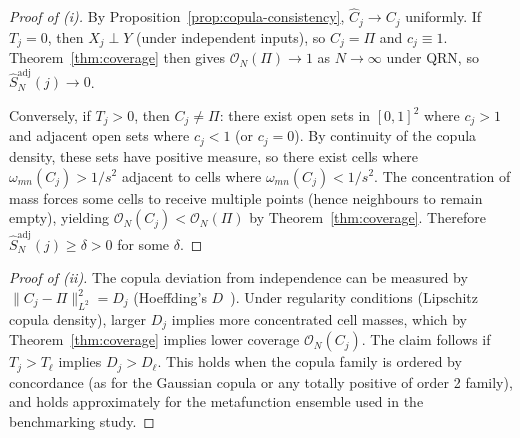 \documentclass[11pt,a4paper]{article}
\theoremstyle{definition}
\begin{document}
\begin{proof}[Proof of (i)]
By Proposition~\ref{prop:copula-consistency}, $\hat{C}_j \to C_j$ uniformly.
If $T_j = 0$, then $X_j \perp Y$ (under independent inputs), so $C_j = \Pi$
and $c_j \equiv 1$.  Theorem~\ref{thm:coverage} then gives
$\mathcal{O}_N(\Pi) \to 1$ as $N \to \infty$ under QRN, so
$\hat{S}^{\mathrm{adj}}_N(j) \to 0$.

Conversely, if $T_j > 0$, then $C_j \ne \Pi$: there exist open sets in
$[0,1]^2$ where $c_j > 1$ and adjacent open sets where $c_j < 1$ (or
$c_j = 0$).  By continuity of the copula density, these sets have positive
measure, so there exist cells where $\omega_{mn}(C_j) > 1/s^2$ adjacent to
cells where $\omega_{mn}(C_j) < 1/s^2$.  The concentration of mass forces
some cells to receive multiple points (hence neighbours to remain empty),
yielding $\mathcal{O}_N(C_j) < \mathcal{O}_N(\Pi)$ by Theorem~\ref{thm:coverage}.
Therefore $\hat{S}^{\mathrm{adj}}_N(j) \ge \delta > 0$ for some $\delta$.
\end{proof}

\begin{proof}[Proof of (ii)]
The copula deviation from independence can be measured by
$\|C_j - \Pi\|_{L^2}^2 = D_j$ (Hoeffding's $D$~\cite{hoeffding1948}).  Under regularity
conditions (Lipschitz copula density), larger $D_j$ implies more
concentrated cell masses, which by Theorem~\ref{thm:coverage} implies
lower coverage $\mathcal{O}_N(C_j)$.  The claim follows if $T_j > T_\ell$
implies $D_j > D_\ell$.  This holds when the copula family is ordered
by concordance (as for the Gaussian copula or any totally positive of
order 2 family), and holds approximately for the metafunction ensemble
used in the benchmarking study.
\end{proof}
\end{document}

